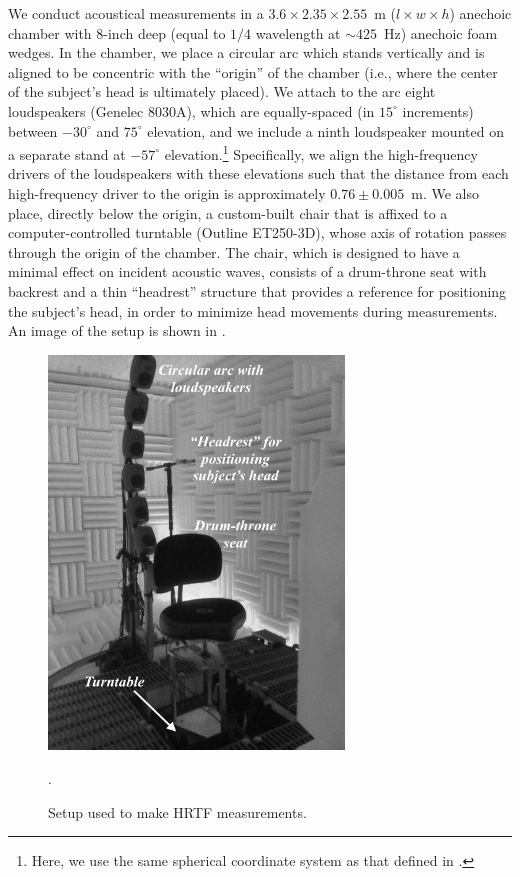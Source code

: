 We conduct acoustical measurements in a $3.6 \times 2.35 \times 2.55$~m ($l \times w \times h$) anechoic chamber with 8-inch deep (equal to $1/4$ wavelength at $\sim425$~Hz) anechoic foam wedges.
In the chamber, we place a circular arc which stands vertically and is aligned to be concentric with the ``origin'' of the chamber (i.e., where the center of the subject's head is ultimately placed). 
We attach to the arc eight loudspeakers (Genelec 8030A), which are equally-spaced (in $15^\circ$ increments) between $-30^\circ$ and $75^\circ$ elevation, and we include a ninth loudspeaker mounted on a separate stand at $-57^\circ$ elevation.\footnote{Here, we use the same spherical coordinate system as that defined in \citet{AES69-2015}.}
Specifically, we align the high-frequency drivers of the loudspeakers with these elevations such that the distance from each high-frequency driver to the origin is approximately $0.76 \pm 0.005$~m.
We also place, directly below the origin, a custom-built chair that is affixed to a computer-controlled turntable (Outline ET250-3D), whose axis of rotation passes through the origin of the chamber.
The chair, which is designed to have a minimal effect on incident acoustic waves,
consists of a drum-throne seat with backrest and a thin ``headrest'' structure that provides a reference for positioning the subject's head,
in order to minimize head movements during measurements.
An image of the setup is shown in .

\begin{figure}[t]
\begin{center}
\includegraphics[width = 0.7\textwidth]{a4_HRTF_measurements/figures/HRTF_setup.png}
\caption{Setup used to make HRTF measurements.}.
\label{fig:HRTF_setup}
\end{center}
\end{figure}

